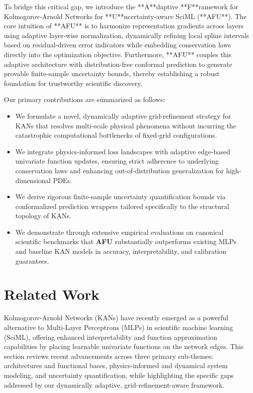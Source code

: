 \documentclass[10pt,twocolumn]{article}
\begin{document}
To bridge this critical gap, we introduce the **A**daptive **F**ramework for Kolmogorov-Arnold Networks for **U**ncertainty-aware SciML (**AFU**). The core intuition of **AFU** is to harmonize representation gradients across layers using adaptive layer-wise normalization, dynamically refining local spline intervals based on residual-driven error indicators while embedding conservation laws directly into the optimization objective. Furthermore, **AFU** couples this adaptive architecture with distribution-free conformal prediction to generate provable finite-sample uncertainty bounds, thereby establishing a robust foundation for trustworthy scientific discovery. 

Our primary contributions are summarized as follows:
\begin{itemize}
    \item We formulate a novel, dynamically adaptive grid-refinement strategy for KANs that resolves multi-scale physical phenomena without incurring the catastrophic computational bottlenecks of fixed-grid configurations.
    \item We integrate physics-informed loss landscapes with adaptive edge-based univariate function updates, ensuring strict adherence to underlying conservation laws and enhancing out-of-distribution generalization for high-dimensional PDEs.
    \item We derive rigorous finite-sample uncertainty quantification bounds via conformalized prediction wrappers tailored specifically to the structural topology of KANs.
    \item We demonstrate through extensive empirical evaluations on canonical scientific benchmarks that \textbf{AFU} substantially outperforms existing MLPs and baseline KAN models in accuracy, interpretability, and calibration guarantees.
\end{itemize}

\section{Related Work}
Kolmogorov-Arnold Networks (KANs) have recently emerged as a powerful alternative to Multi-Layer Perceptrons (MLPs) in scientific machine learning (SciML), offering enhanced interpretability and function approximation capabilities by placing learnable univariate functions on the network edges. This section reviews recent advancements across three primary sub-themes: architectures and functional bases, physics-informed and dynamical system modeling, and uncertainty quantification, while highlighting the specific gaps addressed by our dynamically adaptive, grid-refinement-aware framework.
\end{document}
